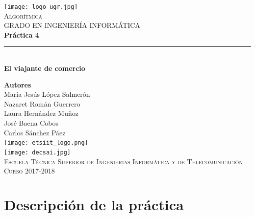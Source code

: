 \documentclass[12pt,spanish]{article}
\begin{document}
\begin{titlepage}

\newlength{\centeroffset}
\setlength{\centeroffset}{-0.5\oddsidemargin}
\addtolength{\centeroffset}{0.5\evensidemargin}
\thispagestyle{empty}

\noindent\hspace*{\centeroffset}
\begin{minipage}{\textwidth}

\centering
\texttt{[image: logo\_ugr.jpg]}\\[1.4cm]

\textsc{ \Large Algorítmica\\[0.2cm]}
\textsc{GRADO EN INGENIERÍA INFORMÁTICA}\\[1cm]

{\Huge\bfseries Práctica 4\\}
\noindent\rule[-1ex]{\textwidth}{3pt}\\[3.5ex]
{\large\bfseries El viajante de comercio}
\end{minipage}

\vspace{1.5cm}
\noindent\hspace*{\centeroffset}
\begin{minipage}{\textwidth}
\centering

\textbf{Autores}\\ {María Jesús López Salmerón \\ Nazaret Román Guerrero \\ Laura Hernández Muñoz \\ José Baena Cobos  \\ Carlos Sánchez Páez}\\[2.5ex]
\texttt{[image: etsiit\_logo.png]}\\[0.1cm]
\vspace{1.5cm}
\texttt{[image: decsai.jpg]}\\[0.1cm]
\vspace{1cm}
\textsc{Escuela Técnica Superior de Ingenierías Informática y de Telecomunicación}\\
\vspace{1cm}
\textsc{Curso 2017-2018}
\end{minipage}
\end{titlepage}
\tableofcontents
\thispagestyle{empty}
\listoffigures
\newpage
\setcounter{page}{1}
\section{Descripción de la práctica}
\end{document}
